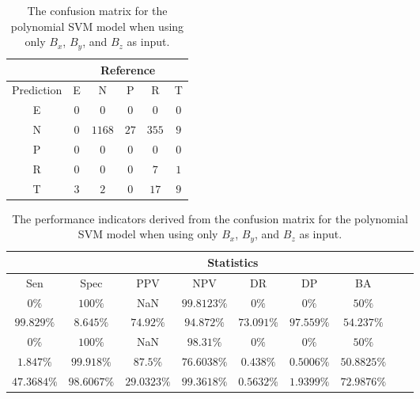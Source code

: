 \begin{table}[!ht]
	\centering
	\begin{tabular}{|c|c|c|c|c|c|}
		\hline
		 & \multicolumn{5}{|c|}{Reference} \\ \hline
		 Prediction & E & N & P & R & T \\ \hline
		 E & $0$ & $0$ & $0$ & $0$ & $0$ \\ \hline
		 N & $0$ & $1168$ & $27$ & $355$ & $9$ \\ \hline
		 P & $0$ & $0$ & $0$ & $0$ & $0$ \\ \hline
		 R & $0$ & $0$ & $0$ & $7$ & $1$ \\ \hline
		 T & $3$ & $2$ & $0$ & $17$ & $9$ \\ \hline
	\end{tabular}
	\caption{The confusion matrix for the polynomial SVM model when using only $B_{x}$, $B_{y}$, and $B_{z}$ as input.}
	\label{tab:cm:coord:svmPoly}
\end{table}

\begin{table}[!ht]
	\centering
	\begin{tabular}{|c|c|c|c|c|c|c|c|c|}
		\hline
		 & \multicolumn{7}{c|}{Statistics} \\ \hline
		Sen & Spec & PPV & NPV & DR & DP & BA \\ \hline
		$0\%$ & $100\%$ & NaN & $99.8123\%$ & $0\%$ & $0\%$ & $50\%$ \\ \hline
		$99.829\%$ & $8.645\%$ & $74.92\%$ & $94.872\%$ & $73.091\%$ & $97.559\%$ & $54.237\%$ \\ \hline
		$0\%$ & $100\%$ & NaN & $98.31\%$ & $0\%$ & $0\%$ & $50\%$ \\ \hline
		$1.847\%$ & $99.918\%$ & $87.5\%$ & $76.6038\%$ & $0.438\%$ & $0.5006\%$ & $50.8825\%$ \\ \hline
		$47.3684\%$ & $98.6067\%$ & $29.0323\%$ & $99.3618\%$ & $0.5632\%$ & $1.9399\%$ & $72.9876\%$ \\ \hline
	\end{tabular}
	\caption{The performance indicators derived from the confusion matrix for the polynomial SVM model when using only $B_{x}$, $B_{y}$, and $B_{z}$ as input.}
	\label{tab:cs:coord:svmPoly}
\end{table}

